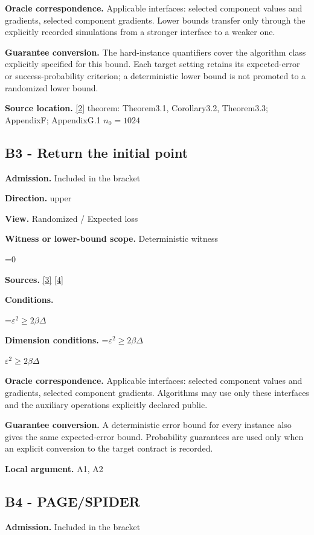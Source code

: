 \documentclass[10pt,a4paper]{article}
\newcommand{\AtlasMath}[1]{\par\begingroup\centering\setbox0=\hbox{$\displaystyle #1$}\ifdim\wd0>1.4\linewidth\typeout{ATLAS WIDE FORMULA: \the\wd0}\fi\ifdim\wd0>\linewidth\resizebox{\linewidth}{!}{\box0}\else\box0\fi\par\endgroup}
\newcommand{\AtlasInlineMath}[1]{\begingroup\setbox0=\hbox{$#1$}\ifdim\wd0>.4\linewidth\endgroup\AtlasMath{#1}\else\endgroup$#1$\fi}
\begin{document}
\textbf{Oracle correspondence.} Applicable interfaces: selected component values and gradients, selected component gradients. Lower bounds transfer only through the explicitly recorded simulations from a stronger interface to a weaker one.

\textbf{Guarantee conversion.} The hard-instance quantifiers cover the algorithm class explicitly specified for this bound. Each target setting retains its expected-error or success-probability criterion; a deterministic lower bound is not promoted to a randomized lower bound.

\textbf{Source location.} \href{https://arxiv.org/pdf/2609.00045v3}{[2]} theorem: Theorem3.1, Corollary3.2, Theorem3.3; AppendixF; AppendixG.1 $n_0=1024$

\subsection{B3 - Return the initial point}
\textbf{Admission.} Included in the bracket

\textbf{Direction.} upper

\textbf{View.} Randomized / Expected loss

\textbf{Witness or lower-bound scope.} Deterministic witness

\AtlasMath{0}
\textbf{Sources.} \href{https://proceedings.mlr.press/v97/zhou19b/zhou19b.pdf}{[3]} \href{https://arxiv.org/pdf/1405.4980}{[4]}

\textbf{Conditions.} 
\AtlasMath{\varepsilon^2\ge2\beta\Delta}


\textbf{Dimension conditions.} \AtlasInlineMath{\varepsilon^2\ge2\beta\Delta}

\textbf{Oracle correspondence.} Applicable interfaces: selected component values and gradients, selected component gradients. Algorithms may use only these interfaces and the auxiliary operations explicitly declared public.

\textbf{Guarantee conversion.} A deterministic error bound for every instance also gives the same expected-error bound. Probability guarantees are used only when an explicit conversion to the target contract is recorded.

\textbf{Local argument.} A1, A2

\subsection{B4 - PAGE/SPIDER}
\textbf{Admission.} Included in the bracket
\end{document}
